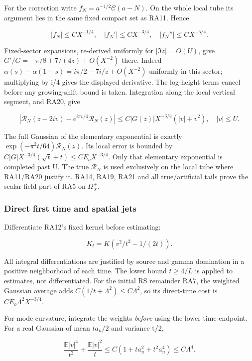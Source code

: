 For the correction write \(f_N=a^{-1/2}\mathcal C(a-N)\). On the whole local tube its argument lies in the same fixed compact set as RA11. Hence

\[
|f_N|\le C X^{-1/4},\quad |f_N'|\le C X^{-3/4},\quad
|f_N''|\le C X^{-5/4}.
\tag{RA20}\label{eq:ansatz-ra20}
\]

Fixed-sector expansions, re-derived uniformly for \(|\Im z|=O(U)\), give \(G'/G=-\pi/8+7/(4z)+O(X^{-2})\) there. Indeed \(\alpha(s)-\alpha(1-s)=i \pi/2-7i/z+O(X^{-2})\) uniformly in this sector; multiplying by i/4 gives the displayed derivative. The log-height terms cancel before any growing-shift bound is taken. Integration along the local vertical segment, and RA20, give

\[
|\mathcal R_N(z-2iv)-e^{i\pi v/4}\mathcal R_N(z)|
 \le C|G(z)|X^{-3/4}(|v|+v^2),\quad |v|\le U.
\tag{RA21}\label{eq:ansatz-ra21}
\]

The full Gaussian of the elementary exponential is exactly \(\exp(-\pi^{2} t/64) \mathcal R_N(z)\). Its local error is bounded by \(C|G|X^{-3/4}(\sqrt t+t)\le C E_{o} X^{-3/4}\). Only that elementary exponential is completed past U. The true \(\mathcal R_N\) is used exclusively on the local tube where RA11/RA20 justify it. RA14, RA19, RA21 and all true/artificial tails prove the scalar field part of RA5 on \(\Omega_{X}^+.\)

\subsubsection{Direct first time and spatial jets}
\label{subsec:ra-5}

Differentiate RA12's fixed kernel before estimating:

\[
K_t=K(v^2/t^2-1/(2t)).
\tag{RA22}\label{eq:ansatz-ra22}
\]

All integral differentiations are justified by source and gamma domination in a positive neighborhood of each time. The lower bound \(t\ge 4/L\) is applied to estimates, not differentiated. For the initial RS remainder RA7, the weighted Gaussian average adds \(C(1/t+\Lambda^{2})\le C \Lambda^{2}\), so its direct-time cost is \(C E_{o} \Lambda^{2} X^{-3/4}\).

For mode curvature, integrate the weights \emph{before} using the lower time endpoint. For a real Gaussian of mean \(ta_{n}/2\) and variance t/2,

\[
\frac{\mathbb E|v|^4}{t^2}+\frac{\mathbb E|v|^2}{t}
 \le C(1+t a_n^2+t^2a_n^4)\le C\Lambda^4.
\tag{RA23}\label{eq:ansatz-ra23}
\]

